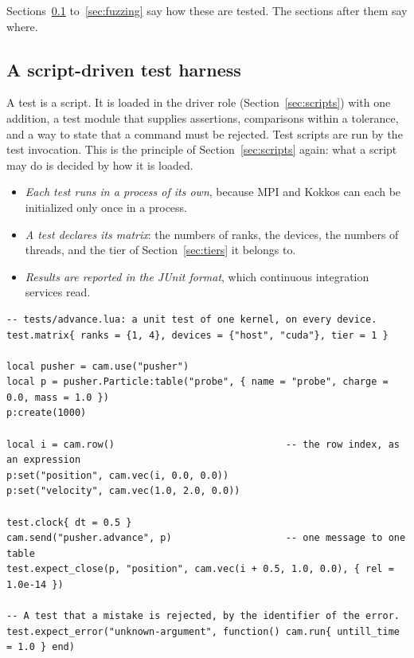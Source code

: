 \documentclass[11pt,a4paper]{article}
\begin{document}
Sections~\ref{sec:harness} to~\ref{sec:fuzzing} say how these are tested.
The sections after them say where.

\subsection{A script-driven test harness}
\label{sec:harness}

A test is a script.  It is loaded in the driver role
(Section~\ref{sec:scripts}) with one addition, a test module that supplies
assertions, comparisons within a tolerance, and a way to state that a
command must be rejected.  Test scripts are run by the test invocation.
This is the principle of Section~\ref{sec:scripts} again: what a script may
do is decided by how it is loaded.

\begin{itemize}
  \item \emph{Each test runs in a process of its own}, because MPI and
        Kokkos can each be initialized only once in a process.
  \item \emph{A test declares its matrix}: the numbers of ranks, the
        devices, the numbers of threads, and the tier of
        Section~\ref{sec:tiers} it belongs to.
  \item \emph{Results are reported in the JUnit format}, which continuous
        integration services read.
\end{itemize}

\begin{lstlisting}[language={[5.3]Lua}]
-- tests/advance.lua: a unit test of one kernel, on every device.
test.matrix{ ranks = {1, 4}, devices = {"host", "cuda"}, tier = 1 }

local pusher = cam.use("pusher")
local p = pusher.Particle:table("probe", { name = "probe", charge = 0.0, mass = 1.0 })
p:create(1000)

local i = cam.row()                              -- the row index, as an expression
p:set("position", cam.vec(i, 0.0, 0.0))
p:set("velocity", cam.vec(1.0, 2.0, 0.0))

test.clock{ dt = 0.5 }
cam.send("pusher.advance", p)                    -- one message to one table
test.expect_close(p, "position", cam.vec(i + 0.5, 1.0, 0.0), { rel = 1.0e-14 })

-- A test that a mistake is rejected, by the identifier of the error.
test.expect_error("unknown-argument", function() cam.run{ untill_time = 1.0 } end)
\end{lstlisting}
\end{document}
